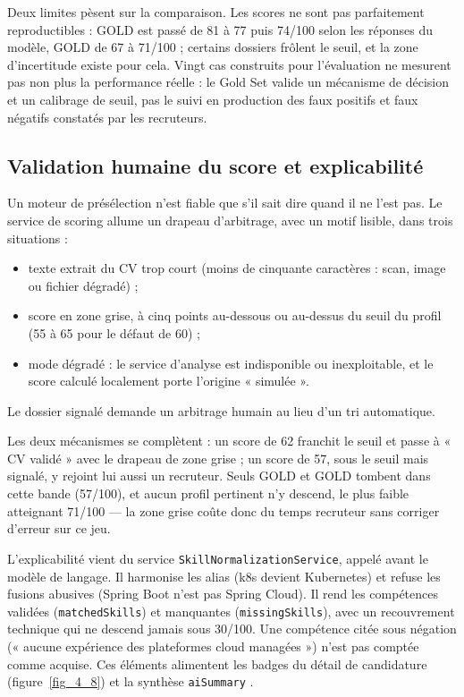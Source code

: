 \documentclass[]{./tpl/isipfe}
\def\_{\textunderscore\allowbreak}
\begin{document}
Deux limites pèsent sur la comparaison. Les scores ne sont pas parfaitement reproductibles : GOLD\_18 est passé de 81 à 77 puis 74/100 selon les réponses du modèle, GOLD\_14 de 67 à 71/100 ; certains dossiers frôlent le seuil, et la zone d’incertitude existe pour cela. Vingt cas construits pour l’évaluation ne mesurent pas non plus la performance réelle : le Gold Set valide un mécanisme de décision et un calibrage de seuil, pas le suivi en production des faux positifs et faux négatifs constatés par les recruteurs.

\subsection{Validation humaine du score et explicabilité}
\label{sec_4_4_6}
Un moteur de présélection n’est fiable que s’il sait dire quand il ne l’est pas. Le service de scoring allume un drapeau d’arbitrage, avec un motif lisible, dans trois situations :
\begin{itemize}
\item texte extrait du CV trop court (moins de cinquante caractères : scan, image ou fichier dégradé) ;
\item score en zone grise, à cinq points au-dessous ou au-dessus du seuil du profil (55 à 65 pour le défaut de 60) ;
\item mode dégradé : le service d’analyse est indisponible ou inexploitable, et le score calculé localement porte l’origine « simulée ».
\end{itemize}
Le dossier signalé demande un arbitrage humain au lieu d’un tri automatique.

Les deux mécanismes se complètent : un score de 62 franchit le seuil et passe à « CV validé » avec le drapeau de zone grise ; un score de 57, sous le seuil mais signalé, y rejoint lui aussi un recruteur. Seuls GOLD\_04 et GOLD\_20 tombent dans cette bande (57/100), et aucun profil pertinent n’y descend, le plus faible atteignant 71/100 — la zone grise coûte donc du temps recruteur sans corriger d’erreur sur ce jeu.

L’explicabilité vient du service \texttt{Skill\allowbreak{}Normalization\allowbreak{}Service}, appelé avant le modèle de langage. Il harmonise les alias (k8s devient Kubernetes) et refuse les fusions abusives (Spring Boot n’est pas Spring Cloud). Il rend les compétences validées (\texttt{matchedSkills}) et manquantes (\texttt{missingSkills}), avec un recouvrement technique qui ne descend jamais sous 30/100. Une compétence citée sous négation (« aucune expérience des plateformes cloud managées ») n’est pas comptée comme acquise. Ces éléments alimentent les badges du détail de candidature (figure~\ref{fig_4_8}) et la synthèse \texttt{aiSummary} \cite{ref23}.
\end{document}
